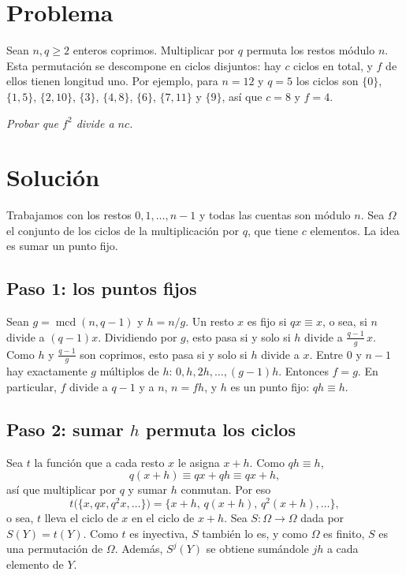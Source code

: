 \documentclass[11pt]{amsproc}
\newcommand{\mcd}{\operatorname{mcd}}
\begin{document}
\section*{Problema}

Sean $n,q\ge 2$ enteros coprimos. Multiplicar por $q$ permuta los restos
módulo $n$. Esta permutación se descompone en ciclos disjuntos: hay $c$
ciclos en total, y $f$ de ellos tienen longitud uno. Por ejemplo, para $n=12$
y $q=5$ los ciclos son $\{0\}$, $\{1,5\}$, $\{2,10\}$, $\{3\}$, $\{4,8\}$,
$\{6\}$, $\{7,11\}$ y $\{9\}$, así que $c=8$ y $f=4$.

{\itshape Probar que $f^2$ divide a $nc$.}

\section*{Solución}

Trabajamos con los restos $0,1,\dots,n-1$ y todas las cuentas son módulo
$n$. Sea $\Omega$ el conjunto de los ciclos de la multiplicación por $q$, que
tiene $c$ elementos. La idea es sumar un punto fijo.

\subsection*{Paso 1: los puntos fijos}

Sean $g=\mcd(n,q-1)$ y $h=n/g$. Un resto $x$ es fijo si $qx\equiv x$, o sea,
si $n$ divide a $(q-1)x$. Dividiendo por $g$, esto pasa si y solo si $h$
divide a $\frac{q-1}{g}\,x$. Como $h$ y $\frac{q-1}{g}$ son coprimos, esto
pasa si y solo si $h$ divide a $x$. Entre $0$ y $n-1$ hay exactamente $g$
múltiplos de $h$: $0,h,2h,\dots,(g-1)h$. Entonces $f=g$. En particular, $f$
divide a $q-1$ y a $n$, $n=fh$, y $h$ es un punto fijo: $qh\equiv h$.

\subsection*{Paso 2: sumar $h$ permuta los ciclos}

Sea $t$ la función que a cada resto $x$ le asigna $x+h$. Como $qh\equiv h$,
\[
  q(x+h)\equiv qx+qh\equiv qx+h,
\]
así que multiplicar por $q$ y sumar $h$ conmutan. Por eso
\[
  t\bigl(\{x,qx,q^2x,\dots\}\bigr)=\{x+h,\,q(x+h),\,q^2(x+h),\dots\},
\]
o sea, $t$ lleva el ciclo de $x$ en el ciclo de $x+h$. Sea $S\colon\Omega\to\Omega$ dada por $S(Y)=t(Y)$.
Como $t$ es inyectiva, $S$ también lo es, y como $\Omega$ es finito, $S$ es
una permutación de $\Omega$. Además, $S^j(Y)$ se obtiene sumándole $jh$ a
cada elemento de $Y$.
\end{document}
